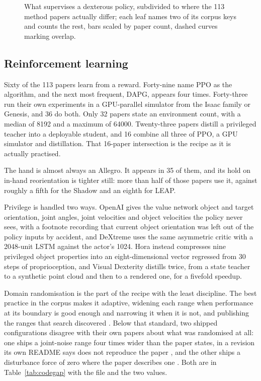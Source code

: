\begin{figure}[!t]
  \centering
  \caption{What supervises a dexterous policy, subdivided to where the 113 method papers actually
  differ; each leaf names two of its corpus keys and counts the rest, bars scaled by paper count,
  dashed curves marking overlap.}
  \label{fig:taxonomy}
\end{figure}

\subsection{Reinforcement learning}
\label{sec:train:rl}

\label{sec:train:rl:recipe}
Sixty of the 113 papers learn from a reward. Forty-nine name PPO as the algorithm, and
the next most frequent, DAPG, appears four times. Forty-three run their own experiments in a
GPU-parallel simulator from the Isaac family or Genesis, and 36 do both. Only 32 papers state an
environment count, with a median of 8192 and a maximum of 64000. Twenty-three papers distill a
privileged teacher into a deployable student, and 16 combine all three of PPO, a GPU simulator and
distillation. That 16-paper intersection is the recipe as it is actually practised.

The hand is almost always an Allegro. It appears in 35 of them, and its hold on in-hand
reorientation is tighter still: more than half of those papers use it, against roughly a fifth
for the Shadow and an eighth for LEAP.

Privilege is handled two ways. OpenAI \cite{openai_dexterity_2018} gives the value network object
and target orientation, joint angles, joint velocities and object velocities the policy never
sees, with a footnote recording that current object orientation was left out of the policy inputs
by accident, and DeXtreme \cite{dextreme_2022} uses the same asymmetric critic with a 2048-unit
LSTM against the actor's 1024. Hora \cite{hora_2022} instead compresses nine privileged object
properties into an eight-dimensional vector regressed from 30 steps of proprioception, and Visual
Dexterity \cite{visual_dexterity_2022} distills twice, from a state teacher to a synthetic point
cloud and then to a rendered one, for a fivefold speedup.

Domain randomisation is the part of the recipe with the least discipline. The best practice in
the corpus makes it adaptive, widening each range when performance at its boundary is good enough
and narrowing it when it is not, and publishing the ranges that search discovered
\cite{openai_rubiks_cube_2019,dextreme_2022}. Below that standard, two shipped configurations
disagree with their own papers about what was randomised at all: one ships a joint-noise range
four times wider than the paper states, in a revision its own README says does not reproduce the
paper \cite{hora_2022}, and the other ships a disturbance force of zero where the paper describes
one \cite{penspin_2024}. Both are in Table~\ref{tab:codegap} with the file and the two values.

